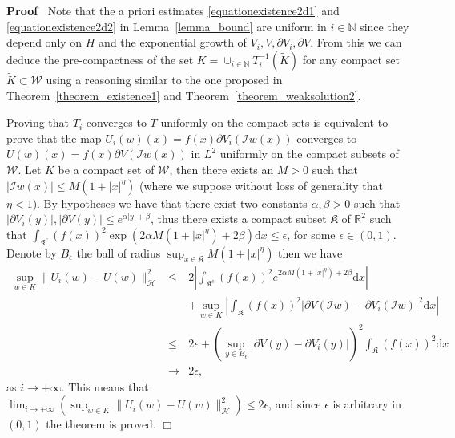 \documentclass[a4paper,10pt]{article}
\newcommand{\mathd}{\mathrm{d}}
\newenvironment{proof}{\noindent\textbf{Proof\ }}{\hspace*{\fill}$\Box$\medskip}
\begin{document}
\begin{proof}
  Note that the a priori estimates {\eqref{equationexistence2d1}} and
  {\eqref{equationexistence2d2}} in Lemma~\ref{lemma_bound} are uniform in $i
  \in \mathbb{N}$ since they depend only on $H$ and the exponential growth of
  $V_i, V, \partial V_i, \partial V$. From this we can deduce the
  pre-compactness of the set $K = \cup_{i \in \mathbb{N}} T_i^{- 1}
  (\tilde{K})$ for any compact set $\tilde{K} \subset \mathcal{W}$ using a
  reasoning similar to the one proposed in Theorem~\ref{theorem_existence1}
  and Theorem~\ref{theorem_weaksolution2}.
  
  Proving that $T_i$ converges to $T$ uniformly on the compact sets is
  equivalent to prove that the map $U_i (w) (x) = f (x) \partial V_i
  (\mathcal{I}w (x))$ converges to $U (w) (x) = f (x) \partial V (\mathcal{I}w
  (x))$ in $L^2$ uniformly on the compact subsets of $\mathcal{W}$. Let $K$ be
  a compact set of $\mathcal{W}$, then there exists an $M > 0$ such that $|
  \mathcal{I}w (x) | \leqslant M (1 + | x |^{\eta})$ (where we suppose without
  loss of generality that $\eta < 1$). By hypotheses we have that there exist
  two constants $\alpha, \beta > 0$ such that $| \partial V_i (y) |, |
  \partial V (y) | \leqslant e^{\alpha | y | + \beta}$, thus there exists a
  compact subset $\mathfrak{K}$ of $\mathbb{R}^2$ such that
  $\int_{\mathfrak{K}^c} (f (x))^2 \exp (2 \alpha M (1 + | x |^{\eta}) + 2
  \beta) \mathd x \leqslant \epsilon$, for some $\epsilon \in (0, 1)$. Denote
  by $B_{\epsilon}$ the ball of radius $\sup_{x \in \mathfrak{K}} M (1 + | x
  |^{\eta})$ then we have
  \begin{eqnarray}
    \sup_{w \in K} \| U_i (w) - U (w) \|^2_{\mathcal{H}} & \leqslant & 2
    \left| \int_{\mathfrak{K}^c} (f (x))^2 e^{2 \alpha M (1 + | x |^{\eta}) +
    2 \beta} \mathd x \right| \nonumber\\
    &  & + \sup_{w \in K} \left| \int_{\mathfrak{K}} (f (x))^2 | \partial V
    (\mathcal{I}w) - \partial V_i (\mathcal{I}w) |^2 \mathd x \right|
    \nonumber\\
    & \leqslant & 2 \epsilon + (\sup_{y \in B_{\epsilon}} | \partial V (y) -
    \partial V_i (y) |)^2 \int_{\mathfrak{K}} (f (x))^2 \mathd x \nonumber\\
    & \rightarrow & 2 \epsilon, \nonumber
  \end{eqnarray}
  as $i \rightarrow + \infty .$ This means that $\lim_{i \rightarrow + \infty}
  (\sup_{w \in K} \| U_i (w) - U (w) \|^2_{\mathcal{H}}) \leqslant 2
  \epsilon$, and since $\epsilon$ is arbitrary in $(0, 1)$ the theorem is
  proved. 
\end{proof}
\end{document}
